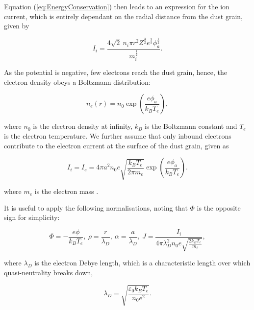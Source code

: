 \documentclass{article}
\begin{document}
\medskip

Equation (\ref{eq:EnergyConservation}) then leads to an expression for the ion current, which is entirely dependant on the radial distance from the 
dust grain, given by

\begin{equation}\label{eq:ABRIi}
I_i = \frac{4\sqrt{2} \ n_i \pi r^2 Z^{\frac{3}{2}}e^{\frac{3}{2}} \phi_a^{\frac{1}{2}} } {m_i^{\frac{1}{2}}}.
\end{equation}

As the potential is negative, few electrons reach the dust grain, hence, the electron density obeys a Boltzmann
distribution:

\begin{equation}\label{eq:ABRed}
n_e(r) = n_0 \exp{\left(\frac{e\phi_a}{k_B T_e}\right)},
\end{equation}

\noindent where $n_0$ is the electron density at infinity, $k_B$ is the Boltzmann constant and $T_e$ is the electron temperature.
We further assume that only inbound electrons contribute to the electron current at the surface of the dust
grain, given as

\begin{equation}\label{eq:ABRIe}
I_i = I_e = 4 \pi a^2 n_0 e \sqrt{\frac{k_B T_e}{2 \pi m_e }} \exp{\left(\frac{e \phi_a}{k_B T_e}\right)}.
\end{equation}  

\noindent where $m_e$ is the electron mass \cite{ABR}.

\medskip

It is useful to apply the following normalisations, noting that $\Phi$ is the opposite
sign for simplicity:

\begin{equation}\label{eq:ABRnorm}
{\Phi = - \frac{e\phi}{k_B T_e}}, \ {\rho = \frac{r}{\lambda_D}},\ {\alpha = \frac{a}{\lambda_D}},\ {J = \frac{I_i}{4 \pi \lambda_D^2 n_0 e \sqrt{\frac{2k_B T_e}{m_i}}}},
\end{equation}
    
\noindent where $\lambda_D$ is the electron Debye length, which is 
a characteristic length over which quasi-neutrality breaks down,

\begin{equation}\label{eq:Debye}
\lambda_D = \sqrt{\frac{\varepsilon_{0} k_{B} T_{e}}{n_{0} e^2}}.
\end{equation}

\smallskip
\end{document}
